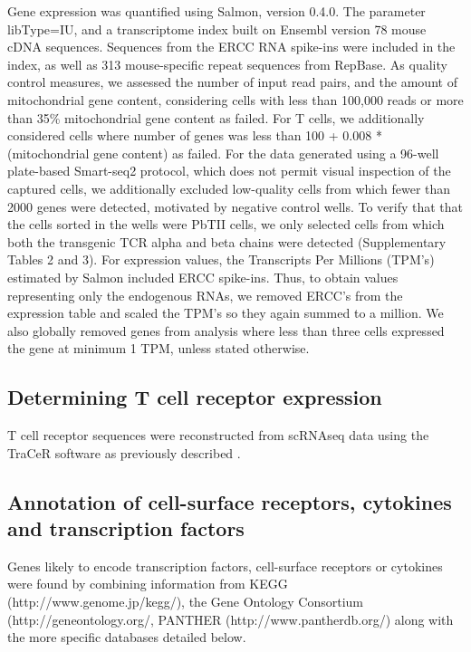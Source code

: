 Gene expression was quantified using Salmon, version 0.4.0. The parameter libType=IU, and a transcriptome index built on Ensembl version 78 mouse cDNA sequences. Sequences from the ERCC RNA spike-ins were included in the index, as well as 313 mouse-specific repeat sequences from RepBase. As quality control measures, we assessed the number of input read pairs, and the amount of mitochondrial gene content, considering cells with less than 100,000 reads or more than 35\% mitochondrial gene content as failed. For T cells, we additionally considered cells where number of genes was less than 100 + 0.008 * (mitochondrial gene content) as failed. For the data generated using a 96-well plate-based Smart-seq2 protocol, which does not permit visual inspection of the captured cells, we additionally excluded low-quality cells from which fewer than 2000 genes were detected, motivated by negative control wells. To verify that that the cells sorted in the wells were PbTII cells, we only selected cells from which both the transgenic TCR alpha and beta chains were detected (Supplementary Tables 2 and 3). For expression values, the Transcripts Per Millions (TPM's) estimated by Salmon included ERCC spike-ins. Thus, to obtain values representing only the endogenous RNAs, we removed ERCC's from the expression table and scaled the TPM's so they again summed to a million. We also globally removed genes from analysis where less than three cells expressed the gene at minimum 1 TPM, unless stated otherwise.

\subsection{Determining T cell receptor expression}

T cell receptor sequences were reconstructed from scRNAseq data using the TraCeR software as
previously described \cite{Stubbington2016-dt}.

\subsection{Annotation of cell-surface receptors, cytokines and transcription factors}

\begin{sloppypar}
Genes likely to encode transcription factors, cell-surface receptors or cytokines were found by combining information from KEGG (http://www.genome.jp/kegg/), the Gene Ontology Consortium (http://geneontology.org/, PANTHER (http://www.pantherdb.org/) along with the more specific databases detailed below.
\end{sloppypar}

